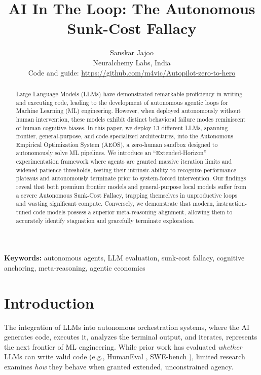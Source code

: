 \documentclass[11pt]{article}
\title{AI In The Loop: The Autonomous Sunk-Cost Fallacy}
\author{
  Sanskar Jajoo\\
  Neuralchemy Labs, India\\
  Code and guide: \url{https://github.com/m4vic/Autopilot-zero-to-hero}
}
\date{}
\begin{document}
\maketitle

\begin{abstract}
Large Language Models (LLMs) have demonstrated remarkable proficiency in writing and executing code, leading to the development of autonomous agentic loops for Machine Learning (ML) engineering. However, when deployed autonomously without human intervention, these models exhibit distinct behavioral failure modes reminiscent of human cognitive biases. In this paper, we deploy 13 different LLMs, spanning frontier, general-purpose, and code-specialized architectures, into the Autonomous Empirical Optimization System (AEOS), a zero-human sandbox designed to autonomously solve ML pipelines. We introduce an ``Extended-Horizon'' experimentation framework where agents are granted massive iteration limits and widened patience thresholds, testing their intrinsic ability to recognize performance plateaus and autonomously terminate prior to system-forced intervention. Our findings reveal that both premium frontier models and general-purpose local models suffer from a severe Autonomous Sunk-Cost Fallacy, trapping themselves in unproductive loops and wasting significant compute. Conversely, we demonstrate that modern, instruction-tuned code models possess a superior meta-reasoning alignment, allowing them to accurately identify stagnation and gracefully terminate exploration.
\end{abstract}

\noindent\textbf{Keywords:} autonomous agents, LLM evaluation, sunk-cost fallacy, cognitive anchoring, meta-reasoning, agentic economics

\section{Introduction}
\label{sec:intro}

The integration of LLMs into autonomous orchestration systems, where the AI generates code, executes it, analyzes the terminal output, and iterates, represents the next frontier of ML engineering. While prior work has evaluated \emph{whether} LLMs can write valid code (e.g., HumanEval \citep{chen2021evaluating}, SWE-bench \citep{jimenez2024swebench}), limited research examines \emph{how} they behave when granted extended, unconstrained agency.
\end{document}
